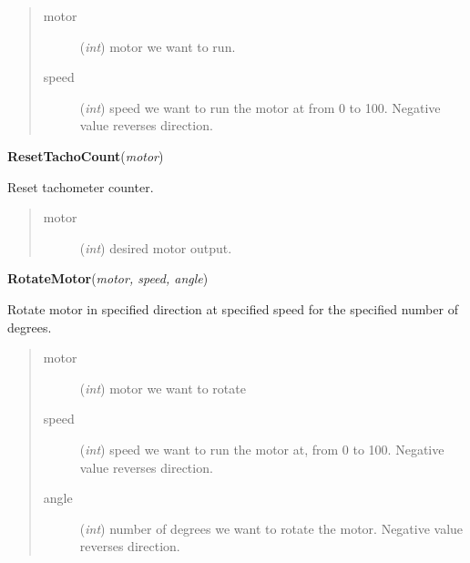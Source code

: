 \documentclass[10pt,a4paper]{article}
\begin{document}
\begin{quote}
    \begin{description}
        
\item[motor] ({\emph{int}}) motor we want to run.

\item[speed] ({\emph{int}}) speed we want to run the motor at from 0 to 100. Negative value reverses direction.   

    \end{description}
\end{quote}

 

\vspace{6pt}
{\bf ResetTachoCount}({\it motor}) 
    
    Reset tachometer counter. 





\begin{quote}
    \begin{description}
        
\item[motor] ({\emph{int}}) desired motor output.

    \end{description}
\end{quote}

 

\vspace{6pt}
{\bf RotateMotor}({\it motor, speed, angle}) 
    
    Rotate motor in specified direction at specified speed for the specified
    number of degrees.




    


\begin{quote}
    \begin{description}
        
\item[motor] ({\emph{int}}) motor we want to rotate

\item[speed] ({\emph{int}}) speed we want to run the motor at, from 0 to 100. Negative value reverses direction.

\item[angle] ({\emph{int}}) number of degrees we want to rotate the motor. Negative value reverses direction.

    \end{description}
\end{quote}

 
\end{document}
